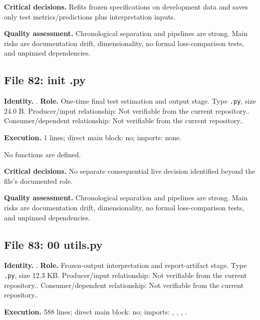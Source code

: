 \documentclass[
  11pt,
  a4paper]{article}
\newcounter{none} %
\begin{document}
\textbf{Critical decisions.} Refits frozen specifications on development
data and saves only test metrics/predictions plus interpretation inputs.

\textbf{Quality assessment.} Chronological separation and pipelines are
strong. Main risks are documentation drift, dimensionality, no formal
loss-comparison tests, and unpinned dependencies.

\subsection{File 82: init .py}\label{file-4841638907466034826}

\textbf{Identity.} .
\textbf{Role.} One-time final test estimation and output stage. Type
\texttt{.py}, size 24.0 B. Producer/input relationship: Not verifiable
from the current repository.. Consumer/dependent relationship: Not
verifiable from the current repository..

\textbf{Execution.} 1 lines; direct main block: no; imports: none.

No functions are defined.

\textbf{Critical decisions.} No separate consequential live decision
identified beyond the file's documented role.

\textbf{Quality assessment.} Chronological separation and pipelines are
strong. Main risks are documentation drift, dimensionality, no formal
loss-comparison tests, and unpinned dependencies.

\subsection{File 83: 00 utils.py}\label{file-6308014345901651812}

\textbf{Identity.} .
\textbf{Role.} Frozen-output interpretation and report-artifact stage.
Type \texttt{.py}, size 12.3 KB. Producer/input relationship: Not
verifiable from the current repository.. Consumer/dependent
relationship: Not verifiable from the current repository..

\textbf{Execution.} 588 lines; direct main block: no; imports:
, ,
,
.
\end{document}
